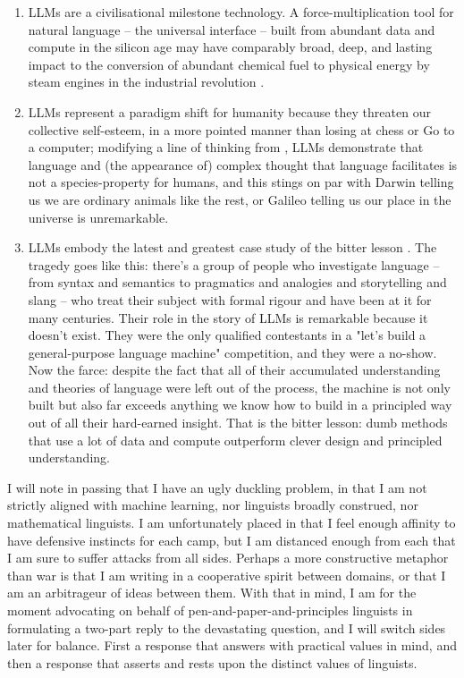 \begin{fullwidth}
\begin{multicols}{2}
\begin{enumerate}
\item{
LLMs are a civilisational milestone technology. A force-multiplication tool for natural language -- the universal interface \citep{} -- built from abundant data and compute in the silicon age may have comparably broad, deep, and lasting impact to the conversion of abundant chemical fuel to physical energy by steam engines in the industrial revolution \citep{}.
}
\item{
LLMs represent a paradigm shift for humanity because they threaten our collective self-esteem, in a more pointed manner than losing at chess or Go to a computer; modifying a line of thinking from \citep{floridi_fourth_2014}, LLMs demonstrate that language and (the appearance of) complex thought that language facilitates is not a species-property for humans, and this stings on par with Darwin telling us we are ordinary animals like the rest, or Galileo telling us our place in the universe is unremarkable.
}
\item{
LLMs embody the latest and greatest case study of the bitter lesson \citep{sutton_bitter_2019}. The tragedy goes like this: there's a group of people who investigate language -- from syntax and semantics to pragmatics and analogies and storytelling and slang -- who treat their subject with formal rigour and have been at it for many centuries. Their role in the story of LLMs is remarkable because it doesn't exist. They were the only qualified contestants in a "let's build a general-purpose language machine" competition, and they were a no-show. Now the farce: despite the fact that all of their accumulated understanding and theories of language were left out of the process, the machine is not only built but also far exceeds anything we know how to build in a principled way out of all their hard-earned insight. That is the bitter lesson: dumb methods that use a lot of data and compute outperform clever design and principled understanding.
}
\end{enumerate}

I will note in passing that I have an ugly duckling problem, in that I am not strictly aligned with machine learning, nor linguists broadly construed, nor mathematical linguists. I am unfortunately placed in that I feel enough affinity to have defensive instincts for each camp, but I am distanced enough from each that I am sure to suffer attacks from all sides. Perhaps a more constructive metaphor than war is that I am writing in a cooperative spirit between domains, or that I am an arbitrageur of ideas between them. With that in mind, I am for the moment advocating on behalf of pen-and-paper-and-principles linguists in formulating a two-part reply to the devastating question, and I will switch sides later for balance. First a response that answers with practical values in mind, and then a response that asserts and rests upon the distinct values of linguists.


\end{multicols}
\end{fullwidth}
